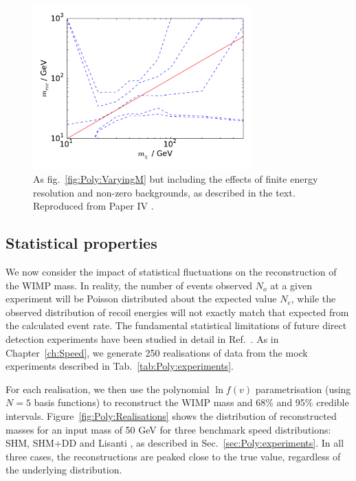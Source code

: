 \begin{figure}[t]
\centering
  \includegraphics[width=0.75\textwidth]{Poly/VaryingM_real.pdf}
  \caption[Reconstructed WIMP mass as a function of input WIMP mass for experiments including the effects of finite backgrounds and energy resolution]{As fig.~\ref{fig:Poly:VaryingM} but including the effects of finite energy resolution and non-zero backgrounds, as described in the text. Reproduced from Paper IV \cite{Kavanagh:2014}.}
  \label{fig:Poly:VaryingM_real}
\end{figure}

\subsection{Statistical properties}
\label{sec:Poly:stats}


We now consider the impact of statistical fluctuations on the reconstruction of the WIMP mass. In reality, the number of events observed $N_o$ at a given experiment will be Poisson distributed about the expected value $N_e$, while the observed distribution of recoil energies will not exactly match that expected from the calculated event rate. The fundamental statistical limitations of future direct detection experiments have been studied in detail in Ref.~\cite{Strege:2012}. As in Chapter~\ref{ch:Speed}, we generate 250 realisations of data from the mock experiments described in Tab.~\ref{tab:Poly:experiments}.

For each realisation, we then use the polynomial $\ln f(v)$ parametrisation (using $N = 5$ basis functions) to reconstruct the WIMP mass and 68\% and 95\% credible intervals. Figure~\ref{fig:Poly:Realisations} shows the distribution of reconstructed masses for an input mass of 50 GeV for three benchmark speed distributions: SHM, SHM+DD and Lisanti \etal, as described in Sec.~\ref{sec:Poly:experiments}. In all three cases, the reconstructions are peaked close to the true value, regardless of the underlying distribution. 

